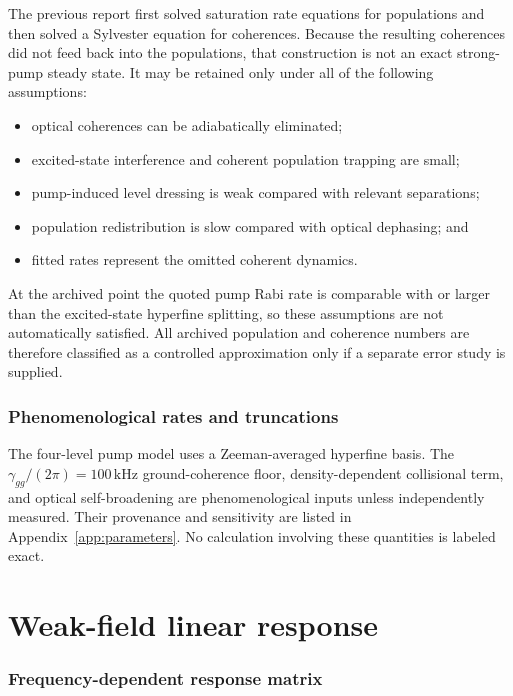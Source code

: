 \documentclass[11pt,a4paper]{article}
\newcommand{\kHz}{\,\mathrm{kHz}}
\begin{document}
The previous report first solved saturation rate equations for populations and
then solved a Sylvester equation for coherences. Because the resulting
coherences did not feed back into the populations, that construction is not an
exact strong-pump steady state. It may be retained only under all of the
following assumptions:
\begin{itemize}
\item optical coherences can be adiabatically eliminated;
\item excited-state interference and coherent population trapping are small;
\item pump-induced level dressing is weak compared with relevant separations;
\item population redistribution is slow compared with optical dephasing; and
\item fitted rates represent the omitted coherent dynamics.
\end{itemize}
At the archived point the quoted pump Rabi rate is comparable with or larger
than the excited-state hyperfine splitting, so these assumptions are not
automatically satisfied. All archived population and coherence numbers are
therefore classified as a controlled approximation only if a separate error
study is supplied.

\section{Phenomenological rates and truncations}

The four-level pump model uses a Zeeman-averaged hyperfine basis. The
$\gamma_{gg}/(2\pi)=100\kHz$ ground-coherence floor, density-dependent
collisional term, and
optical self-broadening are phenomenological inputs unless independently
measured. Their provenance and sensitivity are listed in
Appendix~\ref{app:parameters}. No calculation involving these quantities is
labeled exact.

\part{Weak-field linear response}

\section{Frequency-dependent response matrix}
\end{document}
